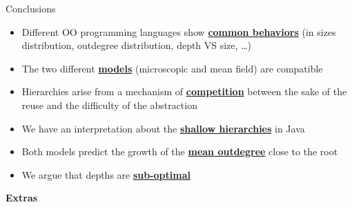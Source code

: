 \documentclass[11pt,svgnames]{beamer}
\begin{document}
\begin{frame}{Conclusions}
\begin{itemize}
\item Different OO programming languages show \textbf{\underline{common behaviors}} (in sizes distribution, outdegree distribution, depth VS size, \dots)

\item The two different \textbf{\underline{models}} (microscopic and mean field) are compatible
\item Hierarchies arise from a mechanism of \textbf{\underline{competition}} between the sake of the reuse and the difficulty of the abstraction
\item We have an interpretation about the \textbf{\underline{shallow hierarchies}} in Java
\item Both models predict the growth of the \textbf{\underline{mean outdegree}} close to the root
\item We argue that depths are \textbf{\underline{sub-optimal}}

\end{itemize}
\end{frame}

\begingroup
{}
\begin{frame}
\center
\textbf {\Huge {\color{white} {Extras}}}

\end{frame}
\endgroup
\end{document}
